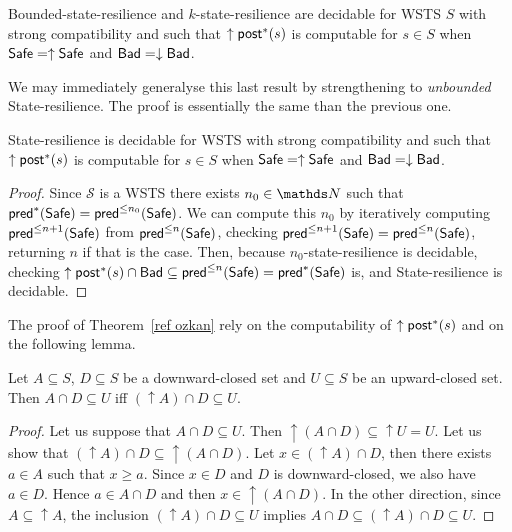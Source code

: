 \begin{theorem}\cite{DBLP:conf/gg/Ozkan22,DBLP:journals/corr/abs-2108-00889}\label{ref ozkan}
{\sc Bounded-state-resilience} and {\sc $k$-state-resilience} are decidable for WSTS $S$ with strong compatibility and such that $\uparrow \textsf{post}^*(s)$ is computable for $s \in S$
when
$\textsf{Safe}=\uparrow \textsf{Safe}$
and $\textsf{Bad}=\downarrow \textsf{Bad}$.
\end{theorem}

We may immediately generalyse this last result by strengthening to \emph{unbounded} {\sc State-resilience}. The proof is essentially the same than the previous one.

\begin{corollary}\label{postcomputable}
{\sc State-resilience} is decidable for WSTS with strong compatibility and such that $\uparrow \textsf{post}^*(s)$ is computable for $s \in S$
when
$\textsf{Safe}=\uparrow \textsf{Safe}$
and $\textsf{Bad}=\downarrow \textsf{Bad}$.
\end{corollary}

\begin{proof}
Since $\mathscr{S}$ is a WSTS there exists $n_0 \in \N$ such that
$\textsf{pred}^*(\textsf{Safe}) =  \textsf{pred}^{\leq n_0}(\textsf{Safe})$. We can compute this $n_0$ by iteratively computing 
$\textsf{pred}^{\leq n+1}(\textsf{Safe})$ from $\textsf{pred}^{\leq n}(\textsf{Safe})$, checking 
$\textsf{pred}^{\leq n+1}(\textsf{Safe}) = \textsf{pred}^{\leq n}(\textsf{Safe})$, 
returning $n$ if that is the case.
Then, because {\sc $n_0$-state-resilience} is decidable, 
checking $\uparrow \textsf{post}^*(s) \cap \textsf{Bad} \subseteq \textsf{pred}^{\leq n}(\textsf{Safe}) = \textsf{pred}^*(\textsf{Safe})$ is,
and {\sc State-resilience} is decidable.
\end{proof}

The proof of Theorem~\ref{ref ozkan} rely on the computability of $\uparrow \textsf{post}^*(s)$ and on the following lemma.

\begin{lemma}\label{Lemma intersection}
Let $A \subseteq S$, $D \subseteq S$ be a downward-closed set and $U \subseteq S$ be an upward-closed set. 
Then $A \cap D \subseteq U$  iff $ (\uparrow  A) \cap D \subseteq U$.
\end{lemma}


\begin{proof}
Let us suppose that $A \cap D \subseteq U$. Then ${\uparrow (A \cap D)} \subseteq {\uparrow U} = U$.
Let us show that $({\uparrow A}) \cap D \subseteq {\uparrow (A \cap D)}$.
Let $x \in ({\uparrow A}) \cap D$, then there exists $a \in A$ such that $x \geq a$.
Since $x \in D$ and $D$ is downward-closed, we also have $a \in D$.
Hence $a \in A \cap D$ and then $x \in { \uparrow (A \cap D)}$.
In the other direction,
since $A \subseteq {\uparrow A}$, the inclusion
$({\uparrow  A}) \cap D \subseteq U$ implies
$A \cap D \subseteq ({\uparrow  A}) \cap D \subseteq U$.
\end{proof}

